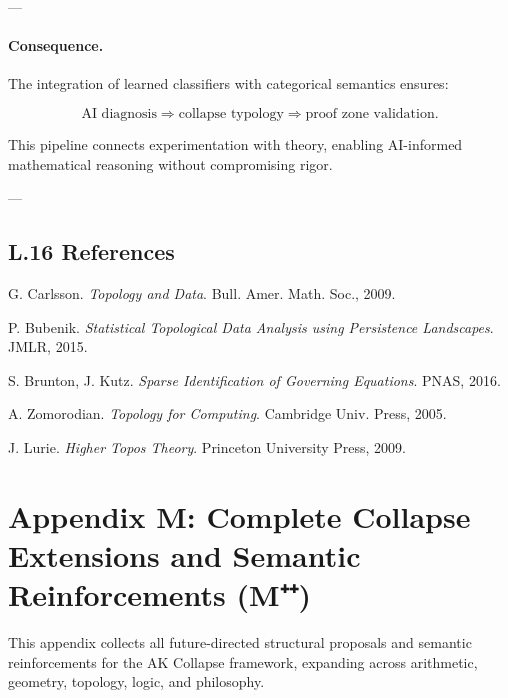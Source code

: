 \documentclass[11pt]{article}
\begin{document}
\begin{axiom}
\begin{axiom}
{{---

\paragraph{Consequence.}

The integration of learned classifiers with categorical semantics ensures:

\[
\text{AI diagnosis} \Rightarrow \text{collapse typology} \Rightarrow \text{proof zone validation}.
\]

This pipeline connects experimentation with theory, enabling AI-informed mathematical reasoning  
without compromising rigor.

---

\subsection*{L.16 References}

\begin{thebibliography}{9}

G. Carlsson.  
\textit{Topology and Data}. Bull. Amer. Math. Soc., 2009.

P. Bubenik.  
\textit{Statistical Topological Data Analysis using Persistence Landscapes}. JMLR, 2015.

S. Brunton, J. Kutz.  
\textit{Sparse Identification of Governing Equations}. PNAS, 2016.

A. Zomorodian.  
\textit{Topology for Computing}. Cambridge Univ. Press, 2005.

J. Lurie.  
\textit{Higher Topos Theory}. Princeton University Press, 2009.

\end{thebibliography}




\section*{Appendix M: Complete Collapse Extensions and Semantic Reinforcements (M⁺⁺)}

This appendix collects all future-directed structural proposals and semantic reinforcements  
for the AK Collapse framework, expanding across arithmetic, geometry, topology, logic, and philosophy.

}}
\end{axiom}
\end{axiom}
\end{document}
